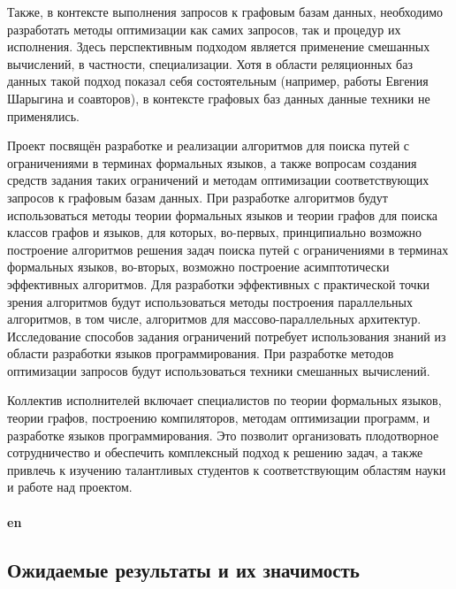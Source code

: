 \documentclass[12pt]{article}  %
\theoremstyle{remark}
\begin{document}
Также, в контексте выполнения запросов к графовым базам данных, необходимо разработать методы оптимизации как самих запросов, так и процедур их исполнения.
Здесь перспективным подходом является применение смешанных вычислений, в частности, специализации.
Хотя в области реляционных баз данных такой подход показал себя состоятельным (например, работы Евгения Шарыгина и соавторов), в контексте графовых баз данных данные техники не применялись.

Проект посвящён разработке и реализации алгоритмов для поиска путей с ограничениями в терминах формальных языков, а также вопросам создания средств задания таких ограничений и методам оптимизации соответствующих запросов к графовым базам данных.
При разработке алгоритмов будут использоваться методы теории формальных языков и теории графов для поиска классов графов и языков, для которых, во-первых, принципиально возможно построение алгоритмов решения задач поиска путей с ограничениями в терминах формальных языков, во-вторых,  возможно построение асимптотически эффективных алгоритмов.
Для разработки эффективных с практической точки зрения алгоритмов будут использоваться методы построения параллельных алгоритмов, в том числе, алгоритмов для массово-параллельных архитектур.
Исследование способов задания ограничений потребует использования знаний из области разработки языков программирования.
При разработке методов оптимизации запросов будут использоваться техники смешанных вычислений.

Коллектив исполнителей включает специалистов по теории формальных языков, теории графов, построению компиляторов, методам оптимизации программ, и разработке языков программирования.
Это позволит организовать плодотворное сотрудничество и обеспечить комплексный подход к решению задач, а также привлечь к изучению талантливых студентов к соответствующим областям науки и работе над проектом.
\\
\\
\textbf{en}\\

\subsection{Ожидаемые результаты и их значимость}
\end{document}
